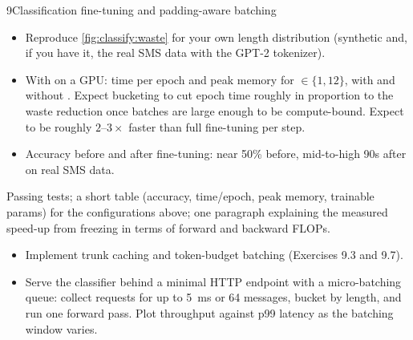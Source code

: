 \begin{labbox}{9}{Classification fine-tuning and padding-aware batching}
\begin{itemize}
\item Reproduce \cref{fig:classify:waste} for your own length distribution (synthetic
and, if you have it, the real SMS data with the GPT-2 tokenizer).
\item With  on a GPU: time per epoch and peak memory for
$\in\{1,12\}$, with and without . Expect
bucketing to cut epoch time roughly in proportion to the waste reduction once batches
are large enough to be compute-bound. Expect  to be
roughly $2$--$3\times$ faster than full fine-tuning per step.
\item Accuracy before and after fine-tuning: near 50\% before, mid-to-high 90s after on
real SMS data.
\end{itemize}

Passing tests; a short table (accuracy, time/epoch, peak memory, trainable params) for
the configurations above; one paragraph explaining the measured speed-up from freezing
in terms of forward and backward FLOPs.

\begin{itemize}
\item Implement trunk caching and token-budget batching (Exercises 9.3 and 9.7).
\item Serve the classifier behind a minimal HTTP endpoint with a micro-batching queue:
collect requests for up to \SI{5}{ms} or 64 messages, bucket by length, and run one
forward pass. Plot throughput against p99 latency as the batching window varies.
\end{itemize}
\end{labbox}
